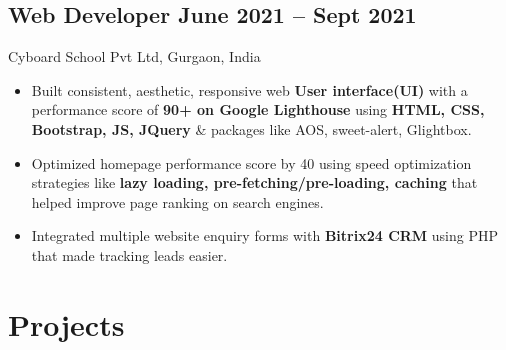 \documentclass[a4,10pt]{article}
\newcommand{\subtext}[1]{
#1\par\vspace{-0.2cm}}
\newenvironment{zitemize}{
\begin{itemize}\itemsep0pt \parskip0pt \parsep1pt}
{\end{itemize}\vspace{-0.5cm}}
\begin{document}
\subsection*{Web Developer \hfill June 2021 -- Sept 2021} 
\subtext{Cyboard School Pvt Ltd, Gurgaon, India} 
    \begin{zitemize}
        \item Built consistent, aesthetic, responsive web \textbf{User interface(UI)} with a performance score of \textbf{90+ on Google Lighthouse}
        using \textbf{HTML, CSS, Bootstrap, JS, JQuery} \& packages like AOS, sweet-alert, Glightbox. 
        \item Optimized homepage performance score by 40 using speed optimization strategies like \textbf{lazy loading, pre-fetching/pre-loading, caching} that helped improve page ranking on search engines.
        \item Integrated multiple website enquiry forms with \textbf{Bitrix24 CRM} using PHP that made tracking leads easier.
    \end{zitemize}





\section{Projects} %



\end{document}
